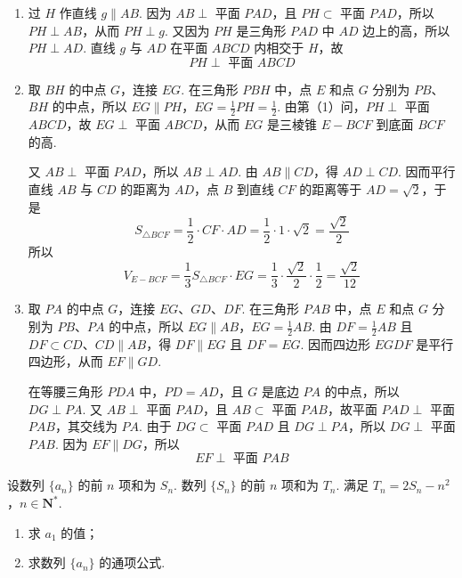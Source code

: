 \begin{solution}
\begin{enumerate}
\item 过 \(H\) 作直线 \(g\parallel AB\). 因为 \(AB\perp\) 平面 \(PAD\)，且 \(PH\subset\) 平面 \(PAD\)，所以 \(PH\perp AB\)，从而 \(PH\perp g\). 又因为 \(PH\) 是三角形 \(PAD\) 中 \(AD\) 边上的高，所以 \(PH\perp AD\). 直线 \(g\) 与 \(AD\) 在平面 \(ABCD\) 内相交于 \(H\)，故
\[
PH\perp\text{ 平面 }ABCD
\]
\item 取 \(BH\) 的中点 \(G\)，连接 \(EG\). 在三角形 \(PBH\) 中，点 \(E\) 和点 \(G\) 分别为 \(PB\)、\(BH\) 的中点，所以
\(EG\parallel PH\)，\(EG=\frac12PH=\frac12\).
由第（1）问，\(PH\perp\) 平面 \(ABCD\)，故 \(EG\perp\) 平面 \(ABCD\)，从而 \(EG\) 是三棱锥 \(E-BCF\) 到底面 \(BCF\) 的高.

又 \(AB\perp\) 平面 \(PAD\)，所以 \(AB\perp AD\). 由 \(AB\parallel CD\)，得 \(AD\perp CD\). 因而平行直线 \(AB\) 与 \(CD\) 的距离为 \(AD\)，点 \(B\) 到直线 \(CF\) 的距离等于 \(AD=\sqrt2\)，于是
\[
S_{\triangle BCF}=\frac12\cdot CF\cdot AD=\frac12\cdot1\cdot\sqrt2=\frac{\sqrt2}{2}
\]
所以
\[
V_{E-BCF}=\frac13S_{\triangle BCF}\cdot EG
=\frac13\cdot\frac{\sqrt2}{2}\cdot\frac12
=\frac{\sqrt2}{12}
\]
\item 取 \(PA\) 的中点 \(G\)，连接 \(EG\)、\(GD\)、\(DF\). 在三角形 \(PAB\) 中，点 \(E\) 和点 \(G\) 分别为 \(PB\)、\(PA\) 的中点，所以
\(EG\parallel AB\)，\(EG=\frac12AB\).
由 \(DF=\frac12AB\) 且 \(DF\subset CD\)、\(CD\parallel AB\)，得 \(DF\parallel EG\) 且 \(DF=EG\). 因而四边形 \(EGDF\) 是平行四边形，从而 \(EF\parallel GD\).

在等腰三角形 \(PDA\) 中，\(PD=AD\)，且 \(G\) 是底边 \(PA\) 的中点，所以 \(DG\perp PA\). 又 \(AB\perp\) 平面 \(PAD\)，且 \(AB\subset\) 平面 \(PAB\)，故平面 \(PAD\perp\) 平面 \(PAB\)，其交线为 \(PA\). 由于 \(DG\subset\) 平面 \(PAD\) 且 \(DG\perp PA\)，所以 \(DG\perp\) 平面 \(PAB\). 因为 \(EF\parallel DG\)，所以
\[
EF\perp\text{ 平面 }PAB
\]
\end{enumerate}
\end{solution}

\begin{problem}
设数列 \(\{a_{n}\}\) 的前 \(n\) 项和为 \(S_{n}\). 数列 \(\{S_{n}\}\) 的前 \(n\) 项和为 \(T_{n}\). 满足 \(T_{n} = 2S_{n} - n^{2}\)，\(n \in \mathbf{N}^{*}\).
\begin{enumerate}
\item 求 \(a_{1}\) 的值；
\item 求数列 \(\{a_{n}\}\) 的通项公式.
\end{enumerate}
\end{problem}

